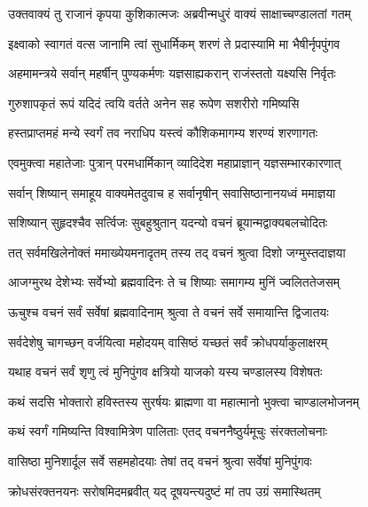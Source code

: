 
\twolineshloka
{उक्तवाक्यं तु राजानं कृपया कुशिकात्मजः}
{अब्रवीन्मधुरं वाक्यं साक्षाच्चण्डालतां गतम्} %

\twolineshloka
{इक्ष्वाको स्वागतं वत्स जानामि त्वां सुधार्मिकम्}
{शरणं ते प्रदास्यामि मा भैषीर्नृपपुंगव} %

\twolineshloka
{अहमामन्त्रये सर्वान् महर्षीन् पुण्यकर्मणः}
{यज्ञसाह्यकरान् राजंस्ततो यक्ष्यसि निर्वृतः} %

\twolineshloka
{गुरुशापकृतं रूपं यदिदं त्वयि वर्तते}
{अनेन सह रूपेण सशरीरो गमिष्यसि} %

\twolineshloka
{हस्तप्राप्तमहं मन्ये स्वर्गं तव नराधिप}
{यस्त्वं कौशिकमागम्य शरण्यं शरणागतः} %

\twolineshloka
{एवमुक्त्वा महातेजाः पुत्रान् परमधार्मिकान्}
{व्यादिदेश महाप्राज्ञान् यज्ञसम्भारकारणात्} %

\twolineshloka
{सर्वान् शिष्यान् समाहूय वाक्यमेतदुवाच ह}
{सर्वानृषीन् सवासिष्ठानानयध्वं ममाज्ञया} %

\twolineshloka
{सशिष्यान् सुहृदश्चैव सर्त्विजः सुबहुश्रुतान्}
{यदन्यो वचनं ब्रूयान्मद्वाक्यबलचोदितः} %

\twolineshloka
{तत् सर्वमखिलेनोक्तं ममाख्येयमनादृतम्}
{तस्य तद् वचनं श्रुत्वा दिशो जग्मुस्तदाज्ञया} %

\twolineshloka
{आजग्मुरथ देशेभ्यः सर्वेभ्यो ब्रह्मवादिनः}
{ते च शिष्याः समागम्य मुनिं ज्वलिततेजसम्} %

\twolineshloka
{ऊचुश्च वचनं सर्वं सर्वेषां ब्रह्मवादिनाम्}
{श्रुत्वा ते वचनं सर्वे समायान्ति द्विजातयः} %

\twolineshloka
{सर्वदेशेषु चागच्छन् वर्जयित्वा महोदयम्}
{वासिष्ठं यच्छतं सर्वं क्रोधपर्याकुलाक्षरम्} %

\twolineshloka
{यथाह वचनं सर्वं शृणु त्वं मुनिपुंगव}
{क्षत्रियो याजको यस्य चण्डालस्य विशेषतः} %

\twolineshloka
{कथं सदसि भोक्तारो हविस्तस्य सुरर्षयः}
{ब्राह्मणा वा महात्मानो भुक्त्वा चाण्डालभोजनम्} %

\twolineshloka
{कथं स्वर्गं गमिष्यन्ति विश्वामित्रेण पालिताः}
{एतद् वचननैष्ठुर्यमूचुः संरक्तलोचनाः} %

\twolineshloka
{वासिष्ठा मुनिशार्दूल सर्वे सहमहोदयाः}
{तेषां तद् वचनं श्रुत्वा सर्वेषां मुनिपुंगवः} %

\twolineshloka
{क्रोधसंरक्तनयनः सरोषमिदमब्रवीत्}
{यद् दूषयन्त्यदुष्टं मां तप उग्रं समास्थितम्} %


